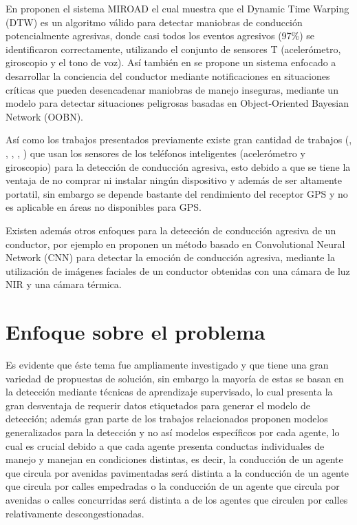 \vspace{5mm} %

En \cite{23} proponen el sistema MIROAD el cual muestra que el Dynamic Time Warping (DTW) es un algoritmo válido para detectar maniobras de conducción potencialmente agresivas, donde casi todos los eventos agresivos (97\%) se identificaron correctamente, utilizando el conjunto de sensores T (aceler\'{o}metro, giroscopio y el tono de voz). As\'{i} tambi\'{e}n en \cite{24} se propone un sistema enfocado a desarrollar la conciencia del conductor mediante notificaciones en situaciones críticas que pueden desencadenar maniobras de manejo inseguras, mediante un modelo para detectar situaciones peligrosas basadas en Object-Oriented Bayesian Network (OOBN).

\vspace{5mm} %

As\'{i} como los trabajos presentados previamente existe gran cantidad de trabajos (\cite{25}, \cite{26}, \cite{27}, \cite{28}, \cite{29}) que usan los sensores de los tel\'{e}fonos inteligentes (aceler\'{o}metro y giroscopio) para la detecci\'{o}n de conducci\'{o}n agresiva, esto debido a que se tiene la ventaja de no comprar ni instalar ning\'{u}n dispositivo y adem\'{a}s de ser altamente portatil, sin embargo se depende bastante del rendimiento del receptor GPS y no es aplicable en \'{a}reas no disponibles para GPS.

\vspace{5mm} %

Existen adem\'{a}s otros enfoques para la detecci\'{o}n de conducci\'{o}n agresiva de un conductor, por ejemplo en \cite{22} proponen un método basado en Convolutional Neural Network (CNN) para detectar la emoción de conducción agresiva, mediante la utilizaci\'{o}n de imágenes faciales de un conductor obtenidas con una cámara de luz NIR y una cámara térmica.

\section{Enfoque sobre el problema}

Es evidente que \'{e}ste tema fue ampliamente investigado y que tiene una gran variedad de propuestas de soluci\'{o}n, sin embargo la mayor\'{i}a de estas se basan en la detecci\'{o}n mediante t\'{e}cnicas de aprendizaje supervisado, lo cual presenta la gran desventaja de requerir datos etiquetados para generar el modelo de detecci\'{o}n; adem\'{a}s gran parte de los trabajos relacionados proponen modelos generalizados para la detecci\'{o}n y no as\'{i} modelos espec\'{i}ficos por cada agente, lo cual es crucial debido a que cada agente presenta conductas individuales de manejo y manejan en condiciones distintas, es decir, la conducci\'{o}n de un agente que circula por avenidas pavimentadas ser\'{a} distinta a la conducci\'{o}n de un agente que circula por calles empedradas o la conducci\'{o}n de un agente que circula por avenidas o calles concurridas ser\'{a} distinta a de los agentes que circulen por calles relativamente descongestionadas.

